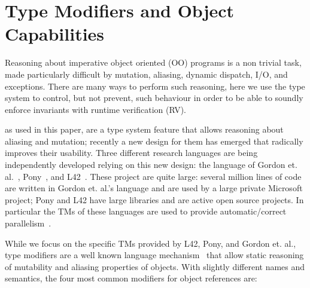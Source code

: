 \section{Type Modifiers and Object Capabilities}
\label{s:TMsAndOCs}
Reasoning about imperative object oriented (OO) programs is a non trivial task,
made particularly difficult by mutation, aliasing, dynamic dispatch, I/O, and exceptions. There are many ways to perform such reasoning, here we use the type system to control, but not prevent, such behaviour in order to be able to soundly enforce invariants with runtime verification (RV).

 as used in this paper, are a type system feature that allows reasoning about aliasing and mutation; recently a new design for them has emerged that radically improves their usability.
Three different research languages are being independently developed relying on this new design: the language of Gordon et. al.~\cite{GordonEtAl12}, Pony~\cite{clebsch2015deny,clebsch2017orca}, and L42~\cite{ServettoZucca15,ServettoEtAl13a,JOT:issue_2011_01/article1,GianniniEtAl16}.
These project are quite large: several million lines of code are written in Gordon et. al.'s language and are used by a large private Microsoft project; Pony and L42 have large libraries and are active open source projects. In particular the TMs of these languages are used to provide automatic/correct parallelism~\cite{GordonEtAl12,clebsch2015deny,clebsch2017orca,ServettoEtAl13a}.

While we focus on the specific TMs provided by L42, Pony, and Gordon et. al., type modifiers
 are a well known language mechanism~\cite{TschantzErnst05,BirkaErnst04,OstlundEtAl08,clebsch2015deny,GianniniEtAl16,GordonEtAl12}
 that allow static reasoning of mutability and aliasing properties of objects.
With slightly different names and semantics, the four most common modifiers for object references are:

